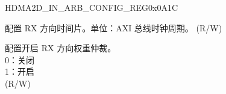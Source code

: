 \begin{register}{H}{DMA2D\_IN\_ARB\_CONFIG\_REG}{0x0A1C}\label{regdesc:DMA2DINARBCONFIGREG}
%
%
%
\regnewline%
\begin{regdesc}\begin{reglist}
\label{fielddesc:DMA2DINARBTIMEOUTNUM}\item [DMA2D\_IN\_ARB\_TIMEOUT\_NUM] 配置 RX 方向时间片。单位：AXI 总线时钟周期。 (R/W)
\label{fielddesc:DMA2DINWEIGHTEN}\item [DMA2D\_IN\_WEIGHT\_EN] 配置开启 RX 方向权重仲裁。\\
0：关闭\\
1：开启\\ (R/W)
\end{reglist}\end{regdesc}
\end{register}


